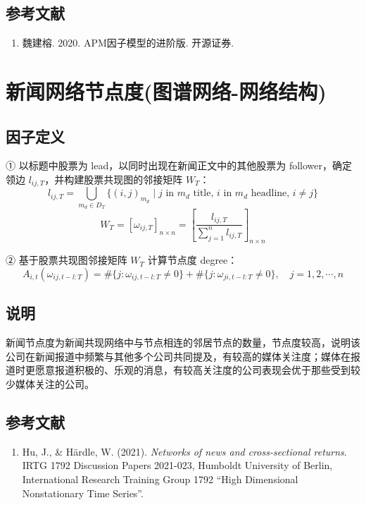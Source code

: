 \documentclass{article}
\begin{document}
\subsection{参考文献}
\begin{enumerate}
    \item 魏建榕. 2020. APM因子模型的进阶版. 开源证券.
\end{enumerate}

\section{新闻网络节点度(图谱网络-网络结构)}

\subsection{因子定义}
① 以标题中股票为 lead，以同时出现在新闻正文中的其他股票为 follower，确定领边 \( l_{ij,T} \)，并构建股票共现图的邻接矩阵 \( W_T \)：
\begin{equation}
    l_{ij,T} = \bigcup_{m_d \in D_T} \{(i,j)_{m_d} \mid j \text{ in } m_d \text{ title, } i \text{ in } m_d \text{ headline, } i \neq j\}
\end{equation}
\begin{equation}
    W_T = [\omega_{ij,T}]_{n \times n} = \left[ \frac{l_{ij,T}}{\sum_{j=1}^n l_{ij,T}} \right]_{n \times n}
\end{equation}

② 基于股票共现图邻接矩阵 \( W_T \) 计算节点度 degree：
\begin{equation}
    A_{i,t}(\omega_{ij,t-l:T}) = \# \{j : \omega_{ij,t-l:T} \neq 0\} + \# \{j : \omega_{ji,t-l:T} \neq 0\}, \quad j = 1, 2, \cdots, n
\end{equation}

\subsection{说明}
新闻节点度为新闻共现网络中与节点相连的邻居节点的数量，节点度较高，说明该公司在新闻报道中频繁与其他多个公司共同提及，有较高的媒体关注度；媒体在报道时更愿意报道积极的、乐观的消息，有较高关注度的公司表现会优于那些受到较少媒体关注的公司。

\subsection{参考文献}
\begin{enumerate}
    \item Hu, J., \& Härdle, W. (2021). \textit{Networks of news and cross-sectional returns}. IRTG 1792 Discussion Papers 2021-023, Humboldt University of Berlin, International Research Training Group 1792 “High Dimensional Nonstationary Time Series”.
\end{enumerate}
\end{document}
